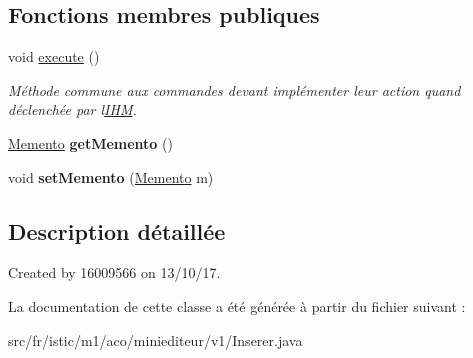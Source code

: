 \subsection*{Fonctions membres publiques}
\begin{DoxyCompactItemize}
\item 
\mbox{\label{classfr_1_1istic_1_1m1_1_1aco_1_1miniediteur_1_1v1_1_1Inserer_acbf4c75249a1836789c8ab4dcc7dcb0d}} 
void \hyperlink{classfr_1_1istic_1_1m1_1_1aco_1_1miniediteur_1_1v1_1_1Inserer_acbf4c75249a1836789c8ab4dcc7dcb0d}{execute} ()
\begin{DoxyCompactList}\small\item\em Méthode commune aux commandes devant implémenter leur action quand déclenchée par l\textquotesingle{}\hyperlink{interfacefr_1_1istic_1_1m1_1_1aco_1_1miniediteur_1_1v1_1_1IHM}{I\+HM}. \end{DoxyCompactList}\item 
\mbox{\label{classfr_1_1istic_1_1m1_1_1aco_1_1miniediteur_1_1v1_1_1Inserer_a4091c321237a04db9509b01e2baf768f}} 
\hyperlink{interfacefr_1_1istic_1_1m1_1_1aco_1_1miniediteur_1_1v1_1_1Memento}{Memento} {\bfseries get\+Memento} ()
\item 
\mbox{\label{classfr_1_1istic_1_1m1_1_1aco_1_1miniediteur_1_1v1_1_1Inserer_a1978002e0aa031a5293ff3263c49fe94}} 
void {\bfseries set\+Memento} (\hyperlink{interfacefr_1_1istic_1_1m1_1_1aco_1_1miniediteur_1_1v1_1_1Memento}{Memento} m)
\end{DoxyCompactItemize}


\subsection{Description détaillée}
Created by 16009566 on 13/10/17. 

La documentation de cette classe a été générée à partir du fichier suivant \+:\begin{DoxyCompactItemize}
\item 
src/fr/istic/m1/aco/miniediteur/v1/Inserer.\+java\end{DoxyCompactItemize}
